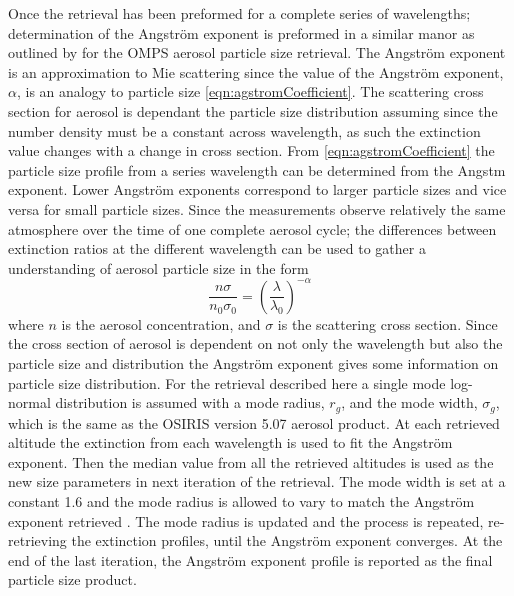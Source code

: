 \documentclass[12pt]{article}
\begin{document}
Once the retrieval has been preformed for a complete series of wavelengths; determination of the Angstr\"{o}m exponent is preformed in a similar manor as outlined by \cite{Rault2013} for the OMPS aerosol particle size retrieval. The Angstr\"{o}m exponent is an approximation to Mie scattering since the value of the Angstr\"{o}m exponent, $\alpha$, is an analogy to particle size \autoref{eqn:agstromCoefficient}. The scattering cross section for aerosol is dependant the particle size distribution assuming since the number density must be a constant across wavelength, as such the extinction value changes with a change in cross section. From \autoref{eqn:agstromCoefficient} the particle size profile from a series wavelength can be determined from the Angstm exponent. Lower Angstr\"{o}m exponents correspond to larger particle sizes and vice versa for small particle sizes. Since the measurements observe relatively the same atmosphere over the time of one complete aerosol cycle; the differences between extinction ratios at the different wavelength can be used to gather a understanding of aerosol particle size in the form
\begin{equation}
    \frac{n\sigma}{n_{0}\sigma_{0}} = \left(\frac{\lambda}{\lambda_{0}}\right)^{-\alpha}
    \label{eqn:agstromCoefficient}
\end{equation}
where $n$ is the aerosol concentration, and $\sigma$ is the scattering cross section. Since the cross section of aerosol is dependent on not only the wavelength but also the particle size and distribution the Angstr\"{o}m exponent gives some information on particle size distribution. For the retrieval described here a single mode log-normal distribution is assumed with a mode radius, $r_{g}$, and the mode width, $\sigma_{g}$, which is the same as the OSIRIS version 5.07 aerosol product. At each retrieved altitude the extinction from each wavelength is used to fit the Angstr\"{o}m exponent. Then the median value from all the retrieved altitudes is used as the new size parameters in next iteration of the retrieval. The mode width is set at a constant 1.6 and the mode radius is allowed to vary to match the Angstr\"{o}m exponent retrieved \citep{Bourassa2008b, Rieger2014}. The mode radius is updated and the process is repeated, re-retrieving the extinction profiles, until the Angstr\"{o}m exponent converges. At the end of the last iteration, the Angstr\"{o}m exponent profile is reported as the final particle size product.
\end{document}
